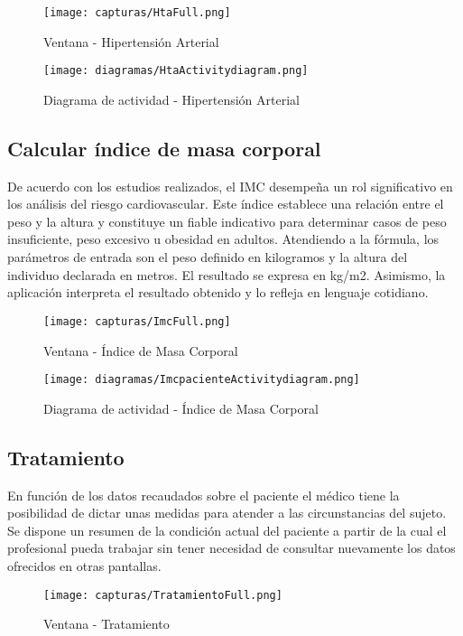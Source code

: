 \documentclass[11pt,spanish,
		listoftables,listoffigures]
		{tfgplantilla}
\begin{document}
\begin{figure}[H]
\centering
\texttt{[image: capturas/HtaFull.png]}
\caption{Ventana - Hipertensión Arterial}
\end{figure}

\begin{figure}[H]
\centering
\texttt{[image: diagramas/HtaActivitydiagram.png]}
\caption{Diagrama de actividad - Hipertensión Arterial}
\end{figure}

\subsection {Calcular índice de masa corporal}

De acuerdo con los estudios realizados, el IMC desempeña un rol significativo en los análisis del riesgo cardiovascular. Este índice establece una relación entre el peso y la altura y constituye un fiable indicativo para determinar casos de peso insuficiente, peso excesivo u obesidad en adultos. 
Atendiendo a la fórmula, los parámetros de entrada son el peso definido en kilogramos y la altura del individuo declarada en metros. El resultado se expresa en kg/m2. Asimismo, la aplicación interpreta el resultado obtenido y lo refleja en lenguaje cotidiano.

\begin{figure}[H]
\centering
\texttt{[image: capturas/ImcFull.png]}
\caption{Ventana - Índice de Masa Corporal}
\end{figure}

\begin{figure}[H]
\centering
\texttt{[image: diagramas/ImcpacienteActivitydiagram.png]}
\caption{Diagrama de actividad - Índice de Masa Corporal}
\end{figure}

\subsection {Tratamiento}

En función de los datos recaudados sobre el paciente el médico tiene la posibilidad de dictar unas medidas para atender a las circunstancias del sujeto. Se dispone un resumen de la condición actual del paciente a partir de la cual el profesional pueda trabajar sin tener necesidad de consultar nuevamente los datos ofrecidos en otras pantallas.

\begin{figure}[H]
\centering
\texttt{[image: capturas/TratamientoFull.png]}
\caption{Ventana - Tratamiento}
\end{figure}
\end{document}
